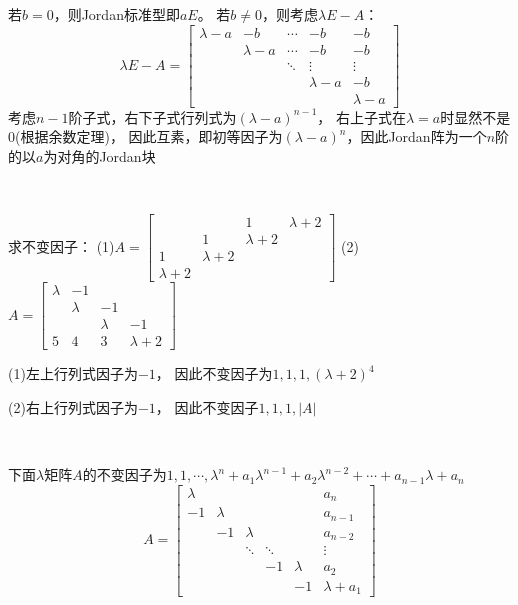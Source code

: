 \begin{solution}
  若$b = 0$，则Jordan标准型即$aE$。
  若$b \neq 0$，则考虑$\lambda E - A$：
  \begin{equation*}
    \lambda E - A = 
    \left[
      \begin{array}{ccccc}
        \lambda - a&-b&\cdots&-b&-b \\
         &\lambda - a&\cdots&-b&-b \\
         &&\ddots&\vdots&\vdots \\
         &&&\lambda - a&-b \\
         &&&&\lambda - a
      \end{array}
    \right]
  \end{equation*}
  考虑$n-1$阶子式，右下子式行列式为$(\lambda - a)^{n-1}$，
  右上子式在$\lambda = a$时显然不是$0$(根据余数定理)，
  因此互素，即初等因子为$(\lambda - a)^n$，因此Jordan阵为一个$n$阶的以$a$为对角的Jordan块
\end{solution}

~

\begin{exercise}[行列式因子应用相关练习]
  求不变因子：
  (1)$A = \left[
    \begin{array}{cccc}
      &&1&\lambda+2 \\
      &1&\lambda+2& \\
      1&\lambda+2&& \\
      \lambda+2&&&
    \end{array}
  \right]$
  (2)$A = \left[
    \begin{array}{cccc}
      \lambda&-1&& \\
             &\lambda&-1& \\
             &&\lambda&-1 \\
             5&4&3&\lambda+2
    \end{array}
  \right]$
\end{exercise}

\begin{solution}
  (1)左上行列式因子为$-1$，
  因此不变因子为$1,1,1,(\lambda+2)^4$

  (2)右上行列式因子为$-1$，
  因此不变因子$1,1,1,|A|$
\end{solution}

~

\begin{theorem}[重要$\lambda$矩阵]
  下面$\lambda$矩阵$A$的不变因子为$1,1,\cdots,\lambda^n + a_1\lambda^{n-1}+a_2\lambda^{n-2} + \cdots + a_{n-1}\lambda + a_n$
  \begin{equation*}
    A = \left[
      \begin{array}{cccccc}
        \lambda&&&&&a_n \\
               -1&\lambda&&&&a_{n-1} \\
               &-1&\lambda&&&a_{n-2} \\
               &&\ddots&\ddots&&\vdots \\
               &&&-1&\lambda&a_2 \\
               &&&&-1&\lambda+a_1
      \end{array}
    \right]
  \end{equation*}
\end{theorem}

